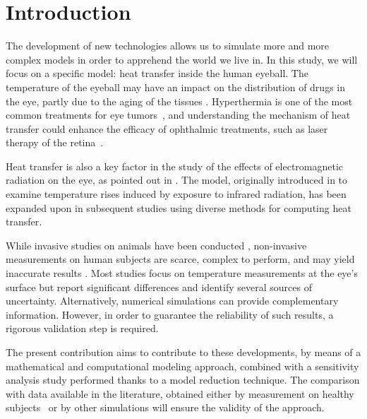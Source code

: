 \section{Introduction}
\label{sec:intro}

The development of new technologies allows us to simulate more and more complex models in order to apprehend the world we live in.
In this study, we will focus on a specific model: heat transfer inside the human eyeball.
The temperature of the eyeball may have an impact on the distribution of drugs in the eye, partly due to the aging of the tissues \cite{BHANDARI2020286}.
Hyperthermia is one of the most common treatments for eye tumors~\cite{li2010}, and understanding the mechanism of heat transfer could enhance the efficacy of ophthalmic treatments, such as laser therapy of the retina~\cite{Masters2004}.

Heat transfer is also a key factor in the study of the effects of electromagnetic radiation on the eye, as pointed out in \cite{Hirata2007,doi:10.1142/S0219519409002936}.
The model, originally introduced in \cite{Scott_1988} to examine temperature rises induced by exposure to infrared radiation,
has been expanded upon in subsequent studies \cite{NG2006268, NG2007829, OOI2008252, li2010} using diverse methods for computing heat transfer.

While invasive studies on animals have been conducted \cite{Purslow2005-ky}, non-invasive measurements on human subjects are scarce, complex to perform, and may yield inaccurate results \cite{ROSENBLUTH1977325}.
Most studies focus on temperature measurements at the eye's surface \cite{MAPSTONE1968237, Efron1989OcularST} but report significant differences and identify several sources of uncertainty.
Alternatively, numerical simulations can provide complementary information.
However, in order to guarantee the reliability of such results, a rigorous validation step is required.

The present contribution aims to contribute to these developments, by means of a mathematical and computational modeling approach, combined with a sensitivity analysis study performed thanks to a model reduction technique.
The comparison with data available in the literature, obtained either by measurement on healthy subjects~\cite{Efron1989OcularST} or by other simulations \cite{NG2006268, NG2007829, li2010} will ensure the validity of the approach.

